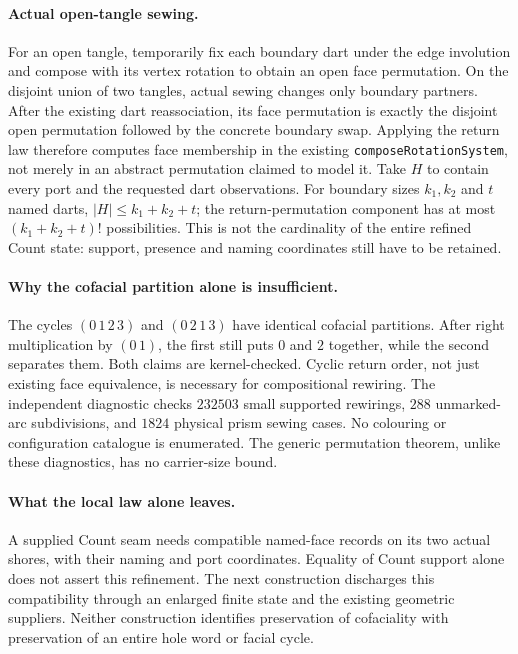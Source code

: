 \paragraph{Actual open-tangle sewing.}
For an open tangle, temporarily fix each boundary dart under the edge
involution and compose with its vertex rotation to obtain an open face
permutation. On the disjoint union of two tangles, actual sewing changes
only boundary partners. After the existing dart reassociation, its face
permutation is exactly the disjoint open permutation followed by the
concrete boundary swap. Applying the return law therefore computes face
membership in the existing \texttt{composeRotationSystem}, not merely in
an abstract permutation claimed to model it.
Take $H$ to contain every port and the requested dart observations. For
boundary sizes $k_1,k_2$ and $t$ named darts, $|H|\le k_1+k_2+t$; the
return-permutation component has at most $(k_1+k_2+t)!$ possibilities.
This is not the cardinality of the entire refined Count state: support,
presence and naming coordinates still have to be retained.

\paragraph{Why the cofacial partition alone is insufficient.}
The cycles $(0\,1\,2\,3)$ and $(0\,2\,1\,3)$ have identical cofacial
partitions. After right multiplication by $(0\,1)$, the first still puts
$0$ and $2$ together, while the second separates them. Both claims are
kernel-checked. Cyclic return order, not just existing face equivalence,
is necessary for compositional rewiring.
The independent diagnostic checks $232503$ small supported rewirings,
$288$ unmarked-arc subdivisions, and $1824$ physical prism sewing cases.
No colouring or configuration catalogue is enumerated. The generic
permutation theorem, unlike these diagnostics, has no carrier-size bound.

\paragraph{What the local law alone leaves.}
A supplied Count seam needs compatible named-face records on its two
actual shores, with their naming and port coordinates. Equality of Count
support alone does not assert this refinement. The next construction
discharges this compatibility through an enlarged finite state and the
existing geometric suppliers. Neither construction identifies preservation
of cofaciality with preservation of an entire hole word or facial cycle.

